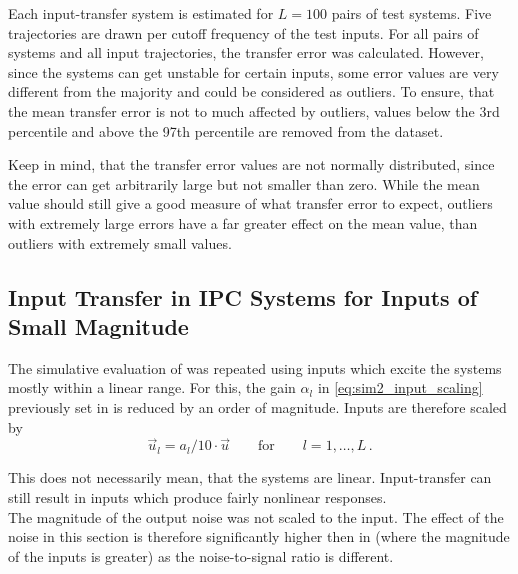 
Each input-transfer system is estimated for $L=100$ pairs of test systems. Five trajectories are drawn per cutoff frequency of the test inputs. For all pairs of systems and all input trajectories, the transfer error was calculated. However, since the systems can get unstable for certain inputs, some error values are very different from the majority and could be considered as outliers. To ensure, that the mean transfer error is not to much affected by outliers, values below the 3rd percentile and above the 97th percentile are removed from the dataset.  
\begin{notebox}
	Keep in mind, that the transfer error values are not normally distributed, since the error can get arbitrarily large but not smaller than zero. While the mean value should still give a good measure of what transfer error to expect, outliers with extremely large errors have a far greater effect on the mean value, than outliers with extremely small values.
\end{notebox} 

\subsection{Input Transfer in IPC Systems for Inputs of Small Magnitude}
The simulative evaluation of  was repeated using inputs which excite the systems mostly within a linear range. For this, the gain $\alpha_l$ in \eqref{eq:sim2_input_scaling} previously set in  is reduced by an order of magnitude. Inputs are therefore scaled by
\begin{equation}
	\vec{u}_l = a_l / 10 \cdot \vec{u} \qquad \text{for} 
	\qquad l = 1,\hdots,L \,.
\end{equation}
\begin{notebox}
	This does not necessarily mean, that the systems are linear. Input-transfer can still result in inputs which produce fairly nonlinear responses.\\
	The magnitude of the output noise was not scaled to the input. The effect of the noise in this section is therefore significantly higher then in  (where the magnitude of the inputs is greater) as the noise-to-signal ratio is different.
\end{notebox}

